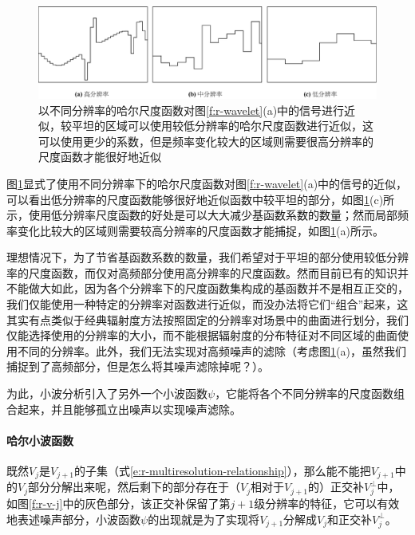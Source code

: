 \begin{figure}
	\begin{fullwidth}
		\includegraphics[width=1.0\thewidth]{figures/r/scalings}
		\caption{以不同分辨率的哈尔尺度函数对图\ref{f:r-wavelet}(a)中的信号进行近似，较平坦的区域可以使用较低分辨率的哈尔尺度函数进行近似，这可以使用更少的系数，但是频率变化较大的区域则需要很高分辨率的尺度函数才能很好地近似}
		\label{f:r-scalings}
	\end{fullwidth}
\end{figure}

图\ref{f:r-scalings}显式了使用不同分辨率下的哈尔尺度函数对图\ref{f:r-wavelet}(a)中的信号的近似，可以看出低分辨率的尺度函数能够很好地近似函数中较平坦的部分，如图\ref{f:r-scalings}(c)所示，使用低分辨率尺度函数的好处是可以大大减少基函数系数的数量；然而局部频率变化比较大的区域则需要较高分辨率的尺度函数才能捕捉，如图\ref{f:r-scalings}(a)所示。

理想情况下，为了节省基函数系数的数量，我们希望对于平坦的部分使用较低分辨率的尺度函数，而仅对高频部分使用高分辨率的尺度函数。然而目前已有的知识并不能做大如此，因为各个分辨率下的尺度函数集构成的基函数并不是相互正交的，我们仅能使用一种特定的分辨率对函数进行近似，而没办法将它们“组合”起来，这其实有点类似于经典辐射度方法按照固定的分辨率对场景中的曲面进行划分，我们仅能选择使用的分辨率的大小，而不能根据辐射度的分布特征对不同区域的曲面使用不同的分辨率。此外，我们无法实现对高频噪声的滤除（考虑图\ref{f:r-scalings}(a)，虽然我们捕捉到了高频部分，但是怎么将其噪声滤除掉呢？）。

为此，小波分析引入了另外一个小波函数$\psi$，它能将各个不同分辨率的尺度函数组合起来，并且能够孤立出噪声以实现噪声滤除。




\paragraph{哈尔小波函数}
既然$V_j$是$V_{j+1}$的子集（式\ref{e:r-multiresolution-relationship}），那么能不能把$V_{j+1}$中的$V_j$部分分解出来呢，然后剩下的部分存在于（$V_j$相对于$V_{j+1}$的）正交补$V^{\perp}_j$中，如图\ref{f:r-v-j}中的灰色部分，该正交补保留了第$j+1$级分辨率的特征，它可以有效地表述噪声部分，小波函数$\psi$的出现就是为了实现将$V_{j+1}$分解成$V_j$和正交补$V^{\perp}_j$。

